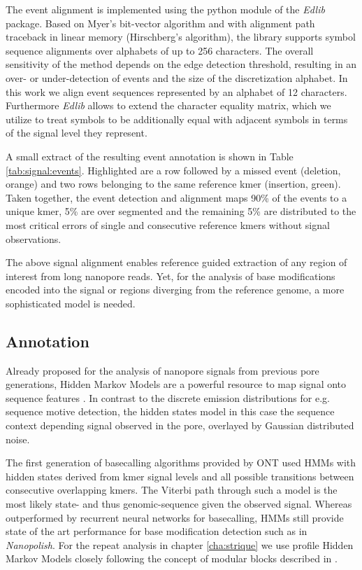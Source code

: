 The event alignment is implemented using the python module of the \textit{Edlib} \cite{Sosic2017} package. Based on Myer's bit-vector algorithm and with alignment path traceback in linear memory (Hirschberg's algorithm), the library supports symbol sequence alignments over alphabets of up to 256 characters. The overall sensitivity of the method depends on the edge detection threshold, resulting in an over- or under-detection of events and the size of the discretization alphabet. In this work we align event sequences represented by an alphabet of 12 characters. Furthermore \textit{Edlib} allows to extend the character equality matrix, which we utilize to treat symbols to be additionally equal with adjacent symbols in terms of the signal level they represent.

A small extract of the resulting event annotation is shown in Table \ref{tab:signal:events}. Highlighted are a row followed by a missed event (deletion, orange) and two rows belonging to the same reference kmer (insertion, green). Taken together, the event detection and alignment maps 90\% of the events to a unique kmer, 5\% are over segmented and the remaining 5\% are distributed to the most critical errors of single and consecutive reference kmers without signal observations.

The above signal alignment enables reference guided extraction of any region of interest from long nanopore reads. Yet, for the analysis of base modifications encoded into the signal or regions diverging from the reference genome, a more sophisticated model is needed.




\subsection{Annotation}
\label{subsec:signal:annotation}

Already proposed for the analysis of nanopore signals from previous pore generations, Hidden Markov Models are a powerful resource to map signal onto sequence features \cite{Schreiber2015}. In contrast to the discrete emission distributions for e.g. sequence motive detection, the hidden states model in this case the sequence context depending signal observed in the pore, overlayed by Gaussian distributed noise.

The first generation of basecalling algorithms provided by ONT used HMMs with hidden states derived from kmer signal levels and all possible transitions between consecutive overlapping kmers. The Viterbi path through such a model is the most likely state- and thus genomic-sequence given the observed signal. Whereas outperformed by recurrent neural networks for basecalling, HMMs still provide state of the art performance for base modification detection such as in \textit{Nanopolish}. For the repeat analysis in chapter \ref{cha:strique} we use profile Hidden Markov Models closely following the concept of modular blocks described in \cite{Schreiber2015}.

